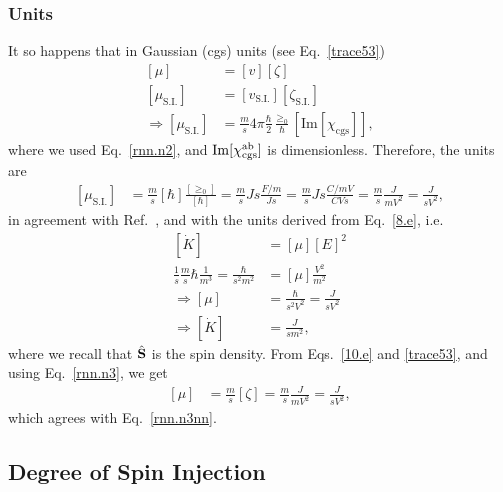 \documentclass[floatfix,prb,aps,superscriptaddress,11pt]{revtex4}
\begin{document}
\subsubsection{Units}

It so happens that in Gaussian (cgs) units (see Eq.~\eqref{trace53}) 
\begin{align}\label{rnn.n20}
[\mu]&=[v]
[\zeta]
\nonumber\\
[\mu_{\mathrm{S.I.}}]&=[v_{\mathrm{S.I.}}]
[\zeta_{\mathrm{S.I.}}]
\nonumber\\
\Rightarrow  
[\mu_{\mathrm{S.I.}}]&=\frac{m}{s}4\pi\frac{\hbar}{2}\frac{\ge_0}{\hbar}
[\mathrm{Im}[\chi_{\mathrm{cgs}}]]
,
\end{align}  
where we used Eq.~\eqref{rnn.n2}, and $\mathrm{Im}[\chi^{\mathrm{a}\mathrm{b}}_{\mathrm{cgs}}]$ is  
dimensionless.  
Therefore, the units are 
\begin{align}\label{rnn.n3nn}
[\mu_{\mathrm{S.I.}}]&=\frac{m}{s}
[\hbar]\frac{[\ge_0]}{[\hbar]}
=\frac{m}{s} Js 
\frac{F/m}{Js}=\frac{m}{s} Js\frac{C/mV}{CVs}
=\frac{m}{s}
\frac{J}{mV^2}
=
\frac{J}{sV^2}
,
\end{align}
in agreement with Ref.~, and with the units
derived  
from Eq.~\eqref{8.e}, i.e.
\begin{align}\label{zp.1}
[\dot K]&=[\mu][E]^2 
\nonumber\\
\frac{1}{s}\frac{m}{s}\hbar\frac{1}{m^3}
=
\frac{\hbar}{s^2m^2}
&=[\mu]
\frac{V^2}{m^2} 
\nonumber\\
\Rightarrow 
[\mu]&=\frac{\hbar}{s^2V^2}=\frac{J}{sV^2}
\nonumber\\
\Rightarrow 
[\dot K]&=\frac{J}{sm^2}
,
\end{align}  
where we recall that $\hat{\mathbf{S}}$ is the spin density.  
From Eqs.~\eqref{10.e} and \eqref{trace53},
and using Eq.~\eqref{rnn.n3}, we get
\begin{align}\label{um.1}
[\mu]&=
\frac{m}{s}
[\zeta]
=
\frac{m}{s}
\frac{J}{mV^2}
=
\frac{J}{sV^2}
,
\end{align} 
which agrees with Eq.~\eqref{rnn.n3nn}.


\subsection{Degree of Spin Injection}
\end{document}
